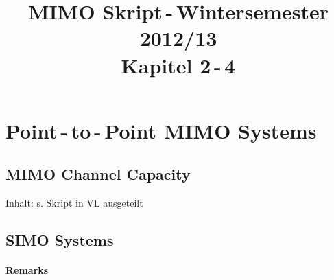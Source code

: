 \documentclass[a4paper, 10pt]{article}
\title{MIMO Skript\,-\,Wintersemester 2012/13 \\ Kapitel 2\,-\,4}
\date{}
\begin{document}
\maketitle
\tableofcontents
\setcounter{section}{1}
\section{Point\,-\,to\,-\,Point MIMO Systems}
\subsection{MIMO Channel Capacity}
Inhalt: s. Skript in VL ausgeteilt
\subsection{SIMO Systems}
\paragraph{Remarks}
\end{document}
